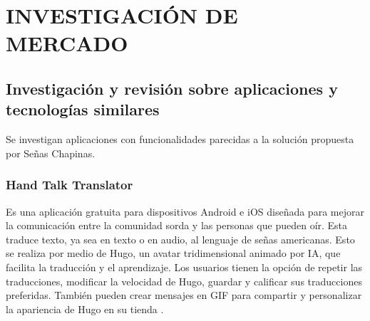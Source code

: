 
\section{INVESTIGACIÓN DE MERCADO}

\subsection{Investigación y revisión sobre aplicaciones y tecnologías similares}

Se investigan aplicaciones con funcionalidades parecidas a la solución propuesta por Señas Chapinas. 

\subsubsection{Hand Talk Translator}

Es una aplicación gratuita para dispositivos Android e iOS diseñada para mejorar la comunicación entre la comunidad sorda y las personas que pueden oír. Esta traduce texto, ya sea en texto o en audio, al lenguaje de señas americanas. Esto se realiza por medio de Hugo, un avatar tridimensional animado por IA, que facilita la traducción y el aprendizaje. Los usuarios tienen la opción de repetir las traducciones, modificar la velocidad de Hugo, guardar y calificar sus traducciones preferidas. También pueden crear mensajes en GIF para compartir y personalizar la apariencia de Hugo en su tienda \cite{Foggetti2023}.

